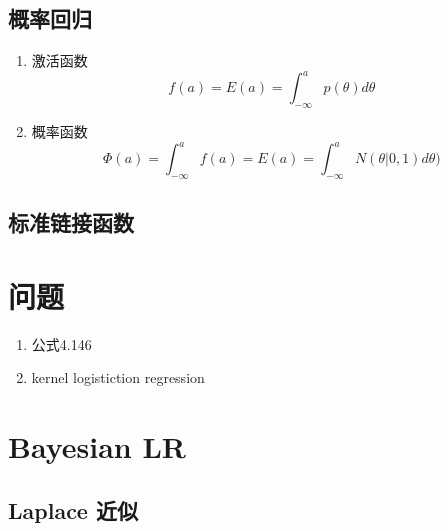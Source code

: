 \subsection{概率回归}
\begin{enumerate}
\item 激活函数
\begin{equation}
f(a) = E(a) = \int_{-\infty}^ap(\theta)d\theta
\end{equation}
\item 概率函数
\begin{equation}
\Phi(a) = \int_{-\infty}^a
f(a) = E(a) = \int_{-\infty}^aN(\theta|0, 1)d\theta)
\end{equation}
\end{enumerate}
\subsection{标准链接函数}
\section{问题}
\begin{enumerate}
\item 公式4.146
\item kernel logistiction regression
\end{enumerate}

\section{Bayesian LR}
\subsection{Laplace 近似}


